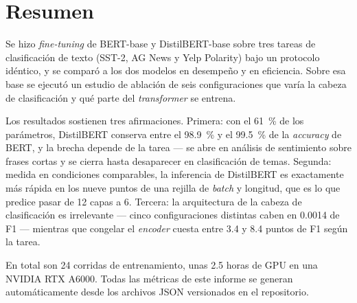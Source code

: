 \section*{Resumen}

Se hizo \textit{fine-tuning} de BERT-base y DistilBERT-base sobre tres tareas
de clasificación de texto (SST-2, AG News y Yelp Polarity) bajo un protocolo
idéntico, y se comparó a los dos modelos en desempeño y en eficiencia. Sobre
esa base se ejecutó un estudio de ablación de seis configuraciones que varía
la cabeza de clasificación y qué parte del \textit{transformer} se entrena.

Los resultados sostienen tres afirmaciones. Primera: con el \SI{61}{\percent}
de los parámetros, DistilBERT conserva entre el \SI{98,9}{\percent} y el
\SI{99,5}{\percent} de la \textit{accuracy} de BERT, y la brecha depende de la
tarea --- se abre en análisis de sentimiento sobre frases cortas y se cierra
hasta desaparecer en clasificación de temas. Segunda: medida en condiciones
comparables, la inferencia de DistilBERT es exactamente  más
rápida en los nueve puntos de una rejilla de \textit{batch} y longitud, que es
lo que predice pasar de 12 capas a 6. Tercera: la arquitectura de la cabeza de
clasificación es irrelevante --- cinco configuraciones distintas caben en
\num{0,0014} de F1 --- mientras que congelar el \textit{encoder} cuesta entre
\num{3,4} y \num{8,4} puntos de F1 según la tarea.

En total son \num{24} corridas de entrenamiento, unas \num{2,5} horas de GPU
en una NVIDIA RTX A6000. Todas las métricas de este informe se generan
automáticamente desde los archivos JSON versionados en el repositorio.

